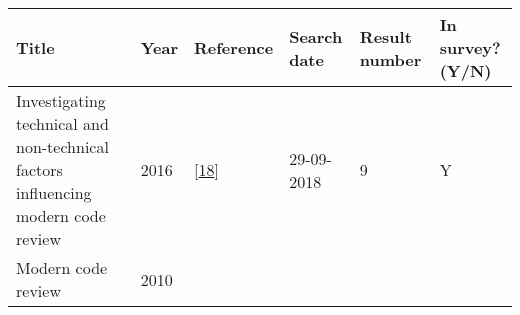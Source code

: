 \documentclass[]{book}
\begin{document}
\begin{longtable}[]{@{}llllll@{}}
\toprule
\begin{minipage}[b]{0.47\columnwidth}\raggedright\strut
Title\strut
\end{minipage} & \begin{minipage}[b]{0.03\columnwidth}\raggedright\strut
Year\strut
\end{minipage} & \begin{minipage}[b]{0.13\columnwidth}\raggedright\strut
Reference\strut
\end{minipage} & \begin{minipage}[b]{0.06\columnwidth}\raggedright\strut
Search date\strut
\end{minipage} & \begin{minipage}[b]{0.07\columnwidth}\raggedright\strut
Result number\strut
\end{minipage} & \begin{minipage}[b]{0.08\columnwidth}\raggedright\strut
In survey? (Y/N)\strut
\end{minipage}\tabularnewline
\midrule
\endhead
\begin{minipage}[t]{0.47\columnwidth}\raggedright\strut
Investigating technical and non-technical factors influencing modern
code review\strut
\end{minipage} & \begin{minipage}[t]{0.03\columnwidth}\raggedright\strut
2016\strut
\end{minipage} & \begin{minipage}[t]{0.13\columnwidth}\raggedright\strut
{[}\protect\hyperlink{ref-baysal2016investigating}{18}{]}\strut
\end{minipage} & \begin{minipage}[t]{0.06\columnwidth}\raggedright\strut
29-09-2018\strut
\end{minipage} & \begin{minipage}[t]{0.07\columnwidth}\raggedright\strut
9\strut
\end{minipage} & \begin{minipage}[t]{0.08\columnwidth}\raggedright\strut
Y\strut
\end{minipage}\tabularnewline
\begin{minipage}[t]{0.47\columnwidth}\raggedright\strut
Modern code review\strut
\end{minipage} & \begin{minipage}[t]{0.03\columnwidth}\raggedright\strut
2010\strut
\end{minipage} & \begin{minipage}[t]{0.13\columnwidth}\raggedright\strut

\end{minipage}
\end{longtable}
\end{document}
